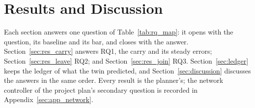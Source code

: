 \section{Results and Discussion}
\label{sec:results}


Each section answers one question of Table~\ref{tab:rq_map}: it opens with the question, its baseline and its bar, and
closes with the answer. Section~\ref{sec:res_carry} answers RQ1, the carry and its steady errors;
Section~\ref{sec:res_leave} RQ2; and Section~\ref{sec:res_join} RQ3. Section~\ref{sec:ledger} keeps the ledger of what
the twin predicted, and Section~\ref{sec:discussion} discusses the answers in the same order. Every result is the
planner's; the network controller of the project plan's secondary question is recorded in
Appendix~\ref{sec:app_network}.













